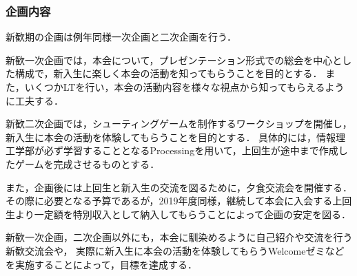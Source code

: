 \subsubsection*{企画内容}
新歓期の企画は例年同様一次企画と二次企画を行う．

新歓一次企画では，本会について，プレゼンテーション形式での総会を中心とした構成で，新入生に楽しく本会の活動を知ってもらうことを目的とする．
また，いくつかLTを行い，本会の活動内容を様々な視点から知ってもらえるように工夫する．

新歓二次企画では，シューティングゲームを制作するワークショップを開催し，新入生に本会の活動を体験してもらうことを目的とする．
具体的には，情報理工学部\firstGrade{}が必ず学習することとなるProcessingを用いて，上回生が途中まで作成したゲームを完成させるものとする．

また，企画後には上回生と新入生の交流を図るために，夕食交流会を開催する．
その際に必要となる予算であるが，2019年度同様，継続して本会に入会する上回生より一定額を特別収入として納入してもらうことによって企画の安定を図る．

新歓一次企画，二次企画以外にも，本会に馴染めるように自己紹介や交流を行う新歓交流会や，
実際に新入生に本会の活動を体験してもらうWelcomeゼミなどを実施することによって，目標を達成する．

